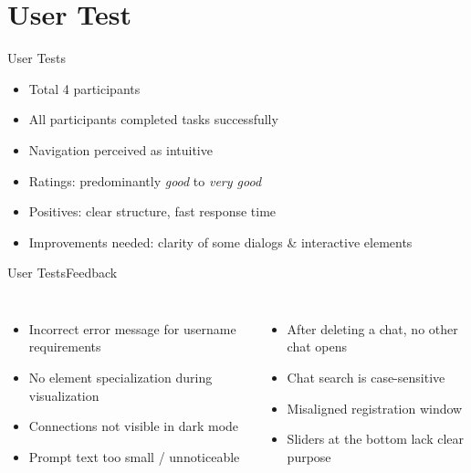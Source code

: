 \documentclass{sdqbeamer}[en]
\begin{document}
\section{User Test}

\begin{frame}{User Tests}
  \begin{itemize}
    \item Total 4 participants
    \item All participants completed tasks successfully
    \item Navigation perceived as intuitive
    \item Ratings: predominantly \textit{good} to \textit{very good}
    \item Positives: clear structure, fast response time
    \item Improvements needed: clarity of some dialogs \& interactive elements
  \end{itemize}
\end{frame}

\begin{frame}{User Tests}{Feedback}
  \begin{columns}
    \begin{itemize}
      \item Incorrect error message for username requirements
      \item No element specialization during visualization
      \item Connections not visible in dark mode
      \item Prompt text too small / unnoticeable
    \end{itemize}
    \begin{itemize}
      \item After deleting a chat, no other chat opens
      \item Chat search is case-sensitive
      \item Misaligned registration window
      \item Sliders at the bottom lack clear purpose
    \end{itemize}
  \end{columns}
\end{frame}
\end{document}

